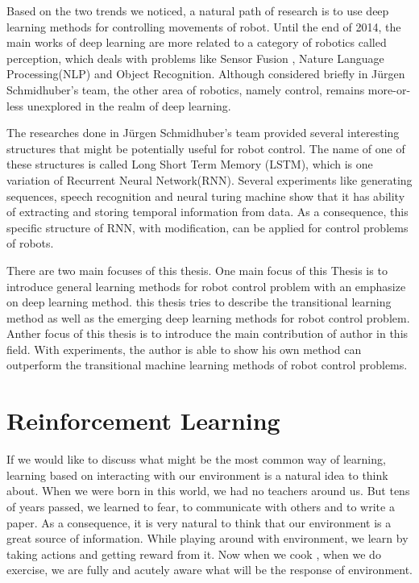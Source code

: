 \documentclass[officiallayout]{tktla}
\begin{document}
Based on the two trends we noticed, a natural path of research is to use deep learning methods for controlling movements of robot. Until the end of 2014,  the main works of deep learning are more related to a category of robotics called perception, which deals with problems like Sensor Fusion \cite{OConnor2013}, Nature Language Processing(NLP)\cite{Cho2014} and Object Recognition\cite{Lenz2013}\cite{Hoffman2014}. Although considered briefly in J{\"u}rgen Schmidhuber's team\cite{Mayer2006}, the other area of robotics, namely control, remains more-or-less unexplored in the realm of deep learning.

The researches done in J{\"u}rgen Schmidhuber's team provided several interesting structures that might be potentially useful for robot control. The name of one of these structures is called Long Short Term Memory (LSTM), which is one variation of Recurrent Neural Network(RNN). Several experiments like generating sequences\cite{Graves2013}, speech recognition\cite{Graves2013b} and neural turing machine \cite{Graves2014} show that it has ability of extracting and storing temporal information from data. As a consequence, this specific structure of RNN, with modification, can be applied for control problems of robots.

There are two main focuses of this thesis. One main focus of this Thesis is to introduce general learning methods for robot control problem with an emphasize on deep learning method. this thesis tries to describe the transitional learning method as well as the emerging deep learning methods for robot control problem. Anther focus of this thesis is to introduce the main contribution of author in this field. With experiments, the author is able to show his own method can outperform the transitional machine learning methods of robot control problems.

\chapter{Reinforcement Learning}

If we would like to discuss what might be the most common way of learning, learning based on interacting with our environment is a natural idea to think about. When we were born in this world, we had no teachers around us. But tens of years passed, we learned to fear, to communicate with others and to write a paper. As a consequence, it is very natural to think that our environment is a great source of information. While playing around with environment, we learn by taking actions and getting reward from it. Now when we cook , when we do exercise, we are fully and acutely aware what will be the response of environment.
\end{document}
